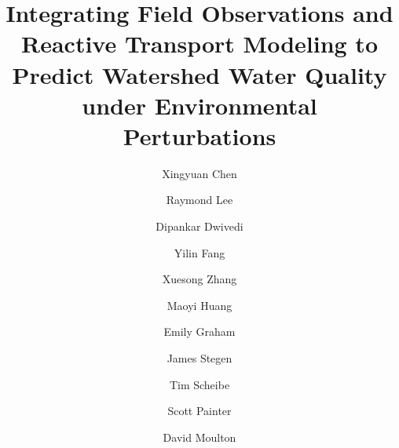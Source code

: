 \documentclass[preprint,review, 12pt]{elsarticle}
\begin{document}
\begin{frontmatter}



\title{Integrating Field Observations and Reactive Transport Modeling to Predict Watershed Water Quality under Environmental Perturbations}


\author{Xingyuan Chen}
\author[label1]{Raymond Lee}
\author{Dipankar Dwivedi}
\author[label1]{Yilin Fang}
\author[label1]{Xuesong Zhang}
\author[label1]{Maoyi Huang}
\author[label1]{Emily Graham}
\author[label1]{James Stegen}
\author[label1]{Tim Scheibe}
\author{Scott Painter}
\author{David Moulton}



\end{frontmatter}
\end{document}
